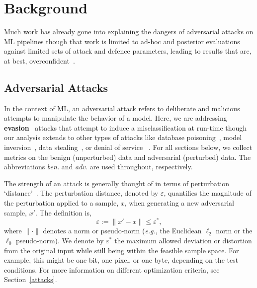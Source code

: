 \section{Background}


Much work has already gone into explaining the dangers of adversarial attacks on ML pipelines \cite{carlini_towards_2017,croce_reliable_2020,pixelattack,fgm,biggio_evasion_2013} though that work is limited to ad-hoc and posterior evaluations against limited sets of attack and defence parameters, leading to results that are, at best, overconfident~\cite{meyers,ma2020imbalanced}. 

\subsection{Adversarial Attacks}

In the context of ML, an adversarial attack refers to deliberate and malicious attempts to manipulate the behavior of a model. Here, we are addressing \textbf{evasion}~\cite{carlini_towards_2017} attacks that attempt to induce a misclassification at run-time though our analysis extends to other types of attacks like database poisoning~\cite{biggio_poisoning_2013,saha2020hidden}, model inversion~\cite{choquette2021label,li2021membership}, data stealing~\cite{orekondy2019knockoff}, or denial of service ~\cite{santos2021universal}. For all sections below, we collect metrics on the benign (unperturbed) data and adversarial (perturbed) data. The abbreviations \textit{ben.} and \textit{adv.} are used throughout, respectively.

The strength of an attack is generally thought of in terms of perturbation `distance'~\cite{croce_reliable_2020,chakraborty_adversarial_2018,pixelattack}. The perturbation distance, denoted by $\varepsilon$, quantifies the magnitude of the perturbation applied to a sample, $x$, when generating a new adversarial sample, $x'$. The definition is,
\begin{equation}
    \varepsilon := \| x' - x \| \leq \varepsilon^*,
    \label{eq:perturbation_distance}
\end{equation}
where $\| \cdot \|$ denotes a norm or pseudo-norm (\textit{e.g.}, the Euclidean $\ell_2$ norm or the $\ell_0$ pseudo-norm). We denote by $\varepsilon^*$ the maximum allowed deviation or distortion from the original input while still being within the feasible sample space. For example, this might be one bit, one pixel, or one byte, depending on the test conditions. For more information on different optimization criteria, see Section~\ref{attacks}.


